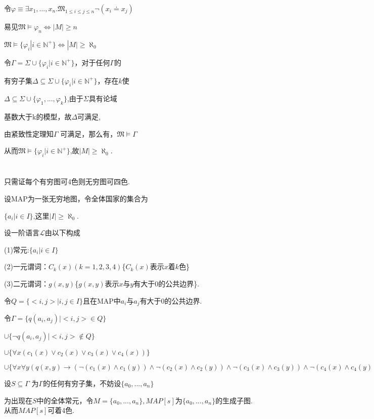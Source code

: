 \documentclass{article}
\begin{document}
令$\varphi \equiv \exists x_1,...,x_n. \mathfrak{M}_{1\leq i\leq j\leq n} \neg (x_i \doteq x_j)$

易见$\mathfrak{M} \models \varphi_n \Leftrightarrow |M|\geq n$

$\mathfrak{M} \models \{ \varphi_i | i\in \mathbb{N}^+ \} \Leftrightarrow |M|\geq \aleph_0$

令$\Gamma =\Sigma \cup \{ \varphi_i | i \in \mathbb{N}^+ \}$，对于任何$\Gamma$的

有穷子集$\Delta \subseteq \Sigma \cup \{ \varphi_i | i  \in \mathbb{N}^+ \} $，存在$k$使

$\Delta \subseteq \Sigma \cup \{ \varphi_1 ,..., \varphi_k\} $,由于$\Sigma$具有论域

基数大于k的模型，故$\Delta$可满足,

由紧致性定理知$\Gamma$ 可满足，那么有，$\mathfrak{M}\vDash \Gamma$

从而$\mathfrak{M} \vDash \{ \varphi_i | i  \in \mathbb{N}^+\}$,故$|M|\geq \aleph_0$.


\section{}

只需证每个有穷图可4色则无穷图可四色.

设MAP为一张无穷地图，令全体国家的集合为

$\{a_i |i\in I\}$,这里$|I|\geq \aleph_0$.

设一阶语言$\mathcal{L}$由以下构成

(1)常元:$\{a_i | i\in I\}$

(2)一元谓词：$C_k (x) (k=1,2,3,4)$\{$C_k (x)$表示$x$着$k$色\}

(3)二元谓词：$g(x,y)$\{$g(x,y)$表示$x$与$y$有大于0的公共边界\}.

令$Q = \{<i,j>|i,j\in I\}$且在MAP中$a_i$与$a_j$有大于0的公共边界.

令$\Gamma = \{q(a_i,a_j) | <i,j> \in Q\}$

$\cup \{\neg q(a_i,a_j) | <i,j> \notin Q\}$

$\cup\{ \forall x(c_1(x)\vee c_2(x)\vee c_3(x)\vee c_4(x))\}$

$\cup\{ \forall x \forall y (q(x, y)\rightarrow (\neg (c_1(x)\wedge c_1(y))  \wedge \neg(c_2(x)\wedge c_2(y))\wedge \neg(c_3(x)\wedge c_3(y))\wedge \neg(c_4(x)\wedge c_4(y))))\}$

设$S\subseteq \Gamma$ 为$\Gamma$的任何有穷子集，不妨设$\{a_0,...,a_n\}$

为出现在$S$中的全体常元，令$M=\{a_0,...,a_n\},MAP[s]$为$\{a_0,\dots,a_n\}$的生成子图. 	从而$MAP[s]$可着4色. 
\end{document}
